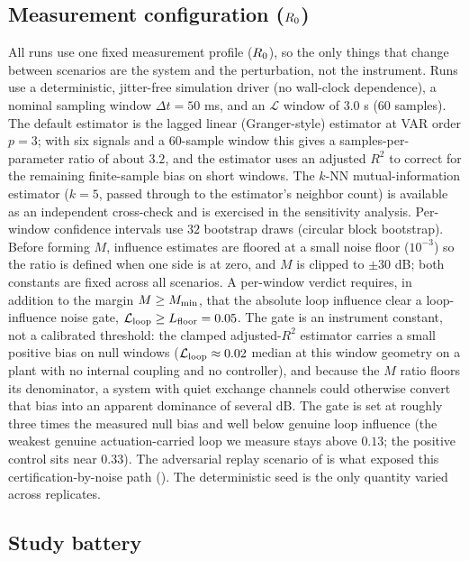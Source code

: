 \documentclass[11pt]{article}
\begin{document}
\subsection{Measurement configuration ($R_0$)}
\label{sec:meas_config}

All runs use one fixed measurement profile ($R_0$), so the only things that change between scenarios are the system and the perturbation, not the instrument. Runs use a deterministic, jitter-free simulation driver (no wall-clock dependence), a nominal sampling window $\Delta t = 50$ ms, and an $\mathcal{L}$ window of $3.0$ s ($60$ samples). The default estimator is the lagged linear (Granger-style) estimator at VAR order $p = 3$; with six signals and a 60-sample window this gives a samples-per-parameter ratio of about $3.2$, and the estimator uses an adjusted $R^2$ to correct for the remaining finite-sample bias on short windows. The $k$-NN mutual-information estimator ($k = 5$, passed through to the estimator's neighbor count) is available as an independent cross-check and is exercised in the sensitivity analysis. Per-window confidence intervals use $32$ bootstrap draws (circular block bootstrap). Before forming $M$, influence estimates are floored at a small noise floor ($10^{-3}$) so the ratio is defined when one side is at zero, and $M$ is clipped to $\pm 30$ dB; both constants are fixed across all scenarios. A per-window \NC verdict requires, in addition to the margin $M \geq M_{\min}$, that the absolute loop influence clear a loop-influence noise gate, $\mathcal{L}_{\text{loop}} \geq L_{\text{floor}} = 0.05$. The gate is an instrument constant, not a calibrated threshold: the clamped adjusted-$R^2$ estimator carries a small positive bias on null windows ($\mathcal{L}_{\text{loop}} \approx 0.02$ median at this window geometry on a plant with no internal coupling and no controller), and because the $M$ ratio floors its denominator, a system with quiet exchange channels could otherwise convert that bias into an apparent dominance of several dB. The gate is set at roughly three times the measured null bias and well below genuine loop influence (the weakest genuine actuation-carried loop we measure stays above $0.13$; the positive control sits near $0.33$). The adversarial replay scenario of  is what exposed this certification-by-noise path (). The deterministic seed is the only quantity varied across replicates.

\subsection{Study battery}
\label{sec:battery}
\end{document}

